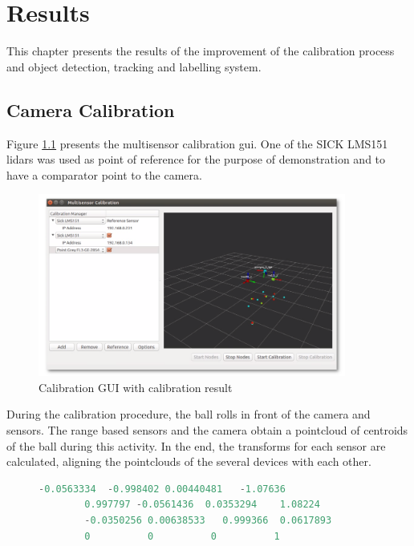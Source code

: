 \chapter{Results}

This chapter presents the results of the improvement of the calibration process and object detection, tracking and labelling system.

\section{Camera Calibration}

Figure \ref{fig:gui} presents the multisensor calibration \gls{gui}. One of the SICK LMS151 \gls{lidar}s was used as point of reference for the purpose of demonstration and to have a comparator point to the camera.

\begin{figure}[htp]
	
	\centering
	\includegraphics[width=0.9\textwidth]{capresults/imgs/gui.png}
	
	\caption{Calibration GUI with calibration result}
	\label{fig:gui}
	
\end{figure}

During the calibration procedure, the ball rolls in front of the camera and sensors. The range based sensors and the camera obtain a pointcloud of centroids of the ball during this activity. In the end, the transforms for each sensor are calculated, aligning the pointclouds of the several devices with each other. 

\begin{figure}
	\begin{center}
		\begin{lstlisting}[label={lst:calib_result}, caption={Calibration output file.},language=c++]
		-0.0563334  -0.998402 0.00440481   -1.07636
		0.997797 -0.0561436  0.0353294    1.08224
		-0.0350256 0.00638533   0.999366  0.0617893
		0          0          0          1	\end{lstlisting}
	\end{center}
\end{figure}

